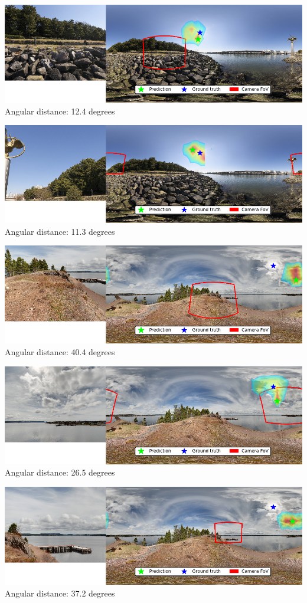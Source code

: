 \begin{multicols}{2}
\includegraphics[width=\mywidth]{pano_aakgxuckdrzzpz_003.jpg}\\
Angular distance: 12.4 degrees

\includegraphics[width=\mywidth]{pano_aakgxuckdrzzpz_002.jpg}\\
Angular distance: 11.3 degrees

\includegraphics[width=\mywidth]{pano_aakkizvmfscmlr.jpg}\\
Angular distance: 40.4 degrees

\includegraphics[width=\mywidth]{pano_aakkizvmfscmlr_005.jpg}\\
Angular distance: 26.5 degrees

\includegraphics[width=\mywidth]{pano_aakkizvmfscmlr_004.jpg}\\
Angular distance: 37.2 degrees


\end{multicols}
